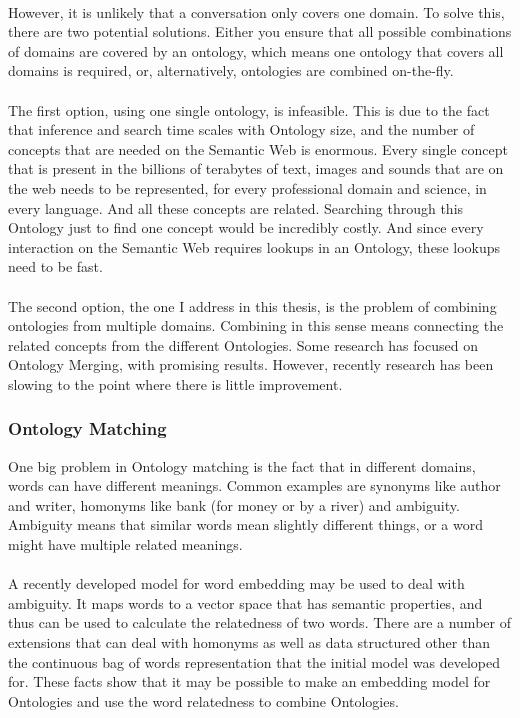 \documentclass{article}
\begin{document}
 \paragraph{}
 However, it is unlikely that a conversation only covers one domain. To solve this, there are two potential solutions. Either you ensure that all possible combinations of domains are covered by an ontology, which means one ontology that covers all domains is required, or, alternatively, ontologies are combined on-the-fly.
 \paragraph{}
 The first option, using one single ontology, is infeasible. This is due to the fact that inference and search time scales with Ontology size, %
 and the number of concepts that are needed on the Semantic Web is enormous. Every single concept that is present in the billions of terabytes of text, images and sounds that are on the web needs to be represented, for every professional domain and science, in every language. And all these concepts are related. Searching through this Ontology just to find one concept would be incredibly costly. And since every interaction on the Semantic Web requires lookups in an Ontology, these lookups need to be fast.
 \paragraph{}
 The second option, the one I address in this thesis, is the problem of combining ontologies from multiple domains. Combining in this sense means connecting the related concepts from the different Ontologies. Some research has focused on Ontology Merging, with promising results. However, recently research has been slowing to the point where there is little improvement.
 
 \subsubsection{Ontology Matching}
 One big problem in Ontology matching is the fact that in different domains, words can have different meanings. Common examples are synonyms like author and writer, homonyms like bank (for money or by a river) and ambiguity. Ambiguity means that similar words mean slightly different things, or a word might have multiple related meanings. %
 \paragraph{}
 A recently developed model for word embedding may be used to deal with ambiguity. It maps words to a vector space that has semantic properties, and thus can be used to calculate the relatedness of two words. There are a number of extensions that can deal with homonyms as well as data structured other than the continuous bag of words representation that the initial model was developed for. These facts show that it may be possible to make an embedding model for Ontologies and use the word relatedness to combine Ontologies\cite{multisense}.
\end{document}
